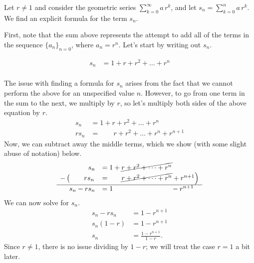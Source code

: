 \documentclass{ximera}
\begin{document}
\begin{model}
 Let $r \neq 1$ and consider the geometric series $\sum\limits_{k=0}^\infty a \, r^k$, and let $s_n = \sum\limits_{k=0}^{n} a \, r^k $.  We find an explicit formula for the term $s_n$.
  
  \begin{explanation}
First, note that the sum above represents the attempt to add all of the terms in the sequence $\{a_n\}_{n=0}$, where $a_n =  r^n$.  Let's start by writing out $s_n$.  

    \begin{align*}
      s_n   &= 1 + r + r^2 + \dots + r^n\\
    \end{align*}

The issue with finding a formula for $s_n$ arises from the fact that we cannot perform the above for an unspecified value $n$.  However, to go from one term in the sum to the next, we multiply by $r$, so let's multiply both sides of the above equation by $r$.
    \begin{align*}
      s_n   &= 1 + r + r^2 + \dots + r^n\\
      r s_n &= ~ \phantom{ 1 + } r + r^2 + \dots + r^n + r^{n+1}
    \end{align*}
Now, we can subtract away the middle terms, which we show (with some slight abuse of notation) below.
 \[     \begin{array}{rl}
      s_n   &= 1 + \cancel{ r + r^2 + \dots + r^n}\\
 -\left(  \phantom{ r^{n+1}} r s_n \right.&=~ \left. \phantom{  1 +  } \cancel{r + r^2 + \dots + r^n} + r^{n+1}\right) \\
 \hline 
     s_n - r s_n &= 1 \phantom{  +  r + r^2 + \dots + r^n } ~ - r^{n+1}\\
    \end{array}
 \]   
 We can now solve for $s_n$.
     \begin{align*}
      s_n - r s_n &= 1 - r^{n+1}\\
      s_n(1-r)    &= 1 - r^{n+1}\\
      s_n &= \frac{1 - r^{n+1}}{1-r}.
    \end{align*}
    Since $r \ne 1$, there is no issue dividing by $1-r$; we will treat the case $r=1$ a bit later.
  \end{explanation}
\end{model}
\end{document}
